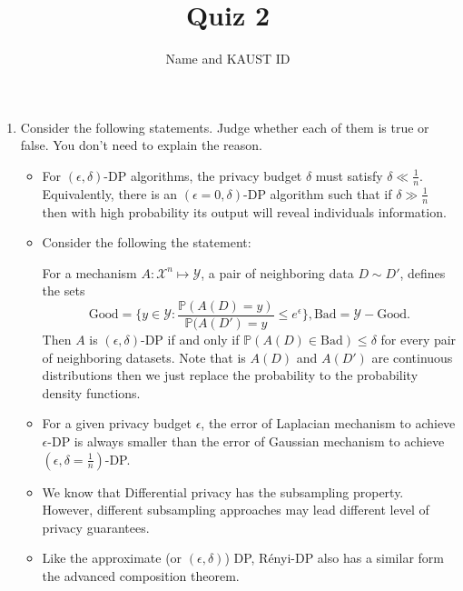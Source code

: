 \documentclass[11pt]{article}
\begin{document}
\author{Name and KAUST ID}
\title{Quiz 2}
\maketitle

\medskip

\begin{enumerate}

\item Consider the following statements. Judge whether each of them is true or false. You don’t need to explain the reason.
\begin{itemize}

\item For $(\epsilon, \delta)$-DP algorithms, the privacy budget $\delta$ must satisfy $\delta\ll \frac{1}{n}$. Equivalently, there is an $(\epsilon=0, \delta)$-DP algorithm such that if $\delta\gg \frac{1}{n}$ then with high probability its output will reveal individuals information. 
\item Consider the following the statement:

For a mechanism $A: \mathcal{X}^n \mapsto \mathcal{Y}$, a pair of neighboring data $D\sim D'$, defines the sets 
\begin{equation}
    \text{Good}=\{y\in \mathcal{Y}: \frac{\mathbb{P}(A(D)=y) }{\mathbb{P}(A(D')=y }\leq e^\epsilon\}, \text{Bad}= \mathcal{Y}-  \text{Good}. 
\end{equation}
Then $A$ is $(\epsilon, \delta)$-DP if and only if $\mathbb{P}(A(D)\in  \text{Bad})\leq \delta$ for every pair of neighboring datasets. Note that is $A(D)$ and $A(D')$ are continuous distributions then we just replace the probability to the probability density functions. 
\item For a given privacy budget $\epsilon$, the error of Laplacian mechanism to achieve $\epsilon$-DP is always smaller than the error of Gaussian mechanism to achieve $(\epsilon, \delta=\frac{1}{n})$-DP.
\item We know that Differential privacy has the subsampling property. However, different subsampling approaches may lead different level of privacy guarantees. 
\item Like the approximate (or $(\epsilon, \delta)$) DP, R\'{e}nyi-DP also has a similar form the advanced composition theorem. 
\end{itemize}

\end{enumerate}
 
\end{document}
